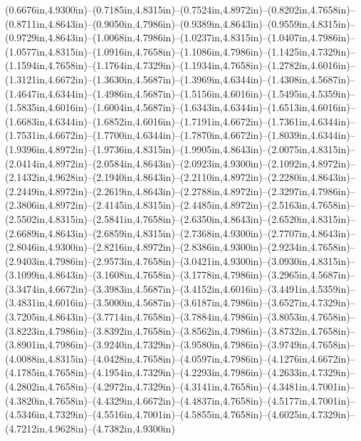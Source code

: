 (0.6676in,4.9300in)--(0.7185in,4.8315in)--(0.7524in,4.8972in)--(0.8202in,4.7658in)--(0.8711in,4.8643in)--(0.9050in,4.7986in)--(0.9389in,4.8643in)--(0.9559in,4.8315in)--(0.9729in,4.8643in)--(1.0068in,4.7986in)--(1.0237in,4.8315in)--(1.0407in,4.7986in)--(1.0577in,4.8315in)--(1.0916in,4.7658in)--(1.1086in,4.7986in)--(1.1425in,4.7329in)--(1.1594in,4.7658in)--(1.1764in,4.7329in)--(1.1934in,4.7658in)--(1.2782in,4.6016in)--(1.3121in,4.6672in)--(1.3630in,4.5687in)--(1.3969in,4.6344in)--(1.4308in,4.5687in)--(1.4647in,4.6344in)--(1.4986in,4.5687in)--(1.5156in,4.6016in)--(1.5495in,4.5359in)--(1.5835in,4.6016in)--(1.6004in,4.5687in)--(1.6343in,4.6344in)--(1.6513in,4.6016in)--(1.6683in,4.6344in)--(1.6852in,4.6016in)--(1.7191in,4.6672in)--(1.7361in,4.6344in)--(1.7531in,4.6672in)--(1.7700in,4.6344in)--(1.7870in,4.6672in)--(1.8039in,4.6344in)--(1.9396in,4.8972in)--(1.9736in,4.8315in)--(1.9905in,4.8643in)--(2.0075in,4.8315in)--(2.0414in,4.8972in)--(2.0584in,4.8643in)--(2.0923in,4.9300in)--(2.1092in,4.8972in)--(2.1432in,4.9628in)--(2.1940in,4.8643in)--(2.2110in,4.8972in)--(2.2280in,4.8643in)--(2.2449in,4.8972in)--(2.2619in,4.8643in)--(2.2788in,4.8972in)--(2.3297in,4.7986in)--(2.3806in,4.8972in)--(2.4145in,4.8315in)--(2.4485in,4.8972in)--(2.5163in,4.7658in)--(2.5502in,4.8315in)--(2.5841in,4.7658in)--(2.6350in,4.8643in)--(2.6520in,4.8315in)--(2.6689in,4.8643in)--(2.6859in,4.8315in)--(2.7368in,4.9300in)--(2.7707in,4.8643in)--(2.8046in,4.9300in)--(2.8216in,4.8972in)--(2.8386in,4.9300in)--(2.9234in,4.7658in)--(2.9403in,4.7986in)--(2.9573in,4.7658in)--(3.0421in,4.9300in)--(3.0930in,4.8315in)--(3.1099in,4.8643in)--(3.1608in,4.7658in)--(3.1778in,4.7986in)--(3.2965in,4.5687in)--(3.3474in,4.6672in)--(3.3983in,4.5687in)--(3.4152in,4.6016in)--(3.4491in,4.5359in)--(3.4831in,4.6016in)--(3.5000in,4.5687in)--(3.6187in,4.7986in)--(3.6527in,4.7329in)--(3.7205in,4.8643in)--(3.7714in,4.7658in)--(3.7884in,4.7986in)--(3.8053in,4.7658in)--(3.8223in,4.7986in)--(3.8392in,4.7658in)--(3.8562in,4.7986in)--(3.8732in,4.7658in)--(3.8901in,4.7986in)--(3.9240in,4.7329in)--(3.9580in,4.7986in)--(3.9749in,4.7658in)--(4.0088in,4.8315in)--(4.0428in,4.7658in)--(4.0597in,4.7986in)--(4.1276in,4.6672in)--(4.1785in,4.7658in)--(4.1954in,4.7329in)--(4.2293in,4.7986in)--(4.2633in,4.7329in)--(4.2802in,4.7658in)--(4.2972in,4.7329in)--(4.3141in,4.7658in)--(4.3481in,4.7001in)--(4.3820in,4.7658in)--(4.4329in,4.6672in)--(4.4837in,4.7658in)--(4.5177in,4.7001in)--(4.5346in,4.7329in)--(4.5516in,4.7001in)--(4.5855in,4.7658in)--(4.6025in,4.7329in)--(4.7212in,4.9628in)--(4.7382in,4.9300in) 